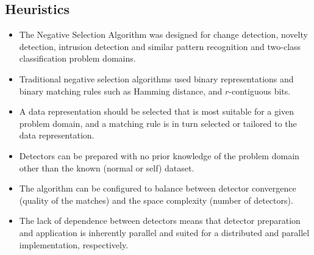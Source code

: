 \subsection{Heuristics}
\begin{itemize}
	\item The Negative Selection Algorithm was designed for change detection, novelty detection, intrusion detection and similar pattern recognition and two-class classification problem domains.
	\item Traditional negative selection algorithms used binary representations and binary matching rules such as Hamming distance, and $r$-contiguous bits.
	\item A data representation should be selected that is most suitable for a given problem domain, and a matching rule is in turn selected or tailored to the data representation.
	\item Detectors can be prepared with no prior knowledge of the problem domain other than the known (normal or self) dataset. 
	\item The algorithm can be configured to balance between detector convergence (quality of the matches) and the space complexity (number of detectors).
	\item The lack of dependence between detectors means that detector preparation and application is inherently parallel and suited for a distributed and parallel implementation, respectively.
\end{itemize}

